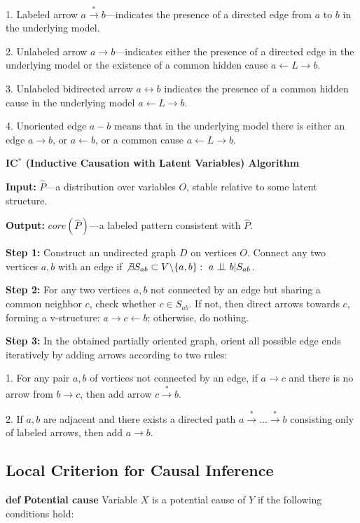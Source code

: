 \documentclass[fleqn]{article}
\newcommand{\independent}{\perp \!\!\! \perp}
\def\define#1{\textbf{def} \textbf{#1}}
\numberwithin{equation}{section}
\numberwithin{theorem}{section}
\numberwithin{figure}{section}
\numberwithin{lemma}{section}
\numberwithin{corollary}{section}
\begin{document}
1. Labeled arrow $a \xrightarrow{*} b$—indicates the presence of a directed edge from $a$ to $b$ in the underlying model.

2. Unlabeled arrow $a \rightarrow b$—indicates either the presence of a directed edge in the underlying model or the existence of a common hidden cause $a \leftarrow L \rightarrow b$.

3. Unlabeled bidirected arrow $a \leftrightarrow b$ indicates the presence of a common hidden cause in the underlying model $a \leftarrow L \rightarrow b$.

4. Unoriented edge $a - b$ means that in the underlying model there is either an edge $a \rightarrow b$, or $a \leftarrow b$, or a common cause $a \leftarrow L \rightarrow b$.

\textbf{IC$^*$ (Inductive Causation with Latent Variables) Algorithm}

\textbf{Input:} $\hat P$—a distribution over variables $O$, stable relative to some latent structure.

\textbf{Output:} $core(\hat P)$—a labeled pattern consistent with $\hat P$.

\textbf{Step 1:} Construct an undirected graph $D$ on vertices $O$. Connect any two vertices $a, b$ with an edge if $\not \exists S_{ab} \subset V \backslash \{a,b\}:\ a \independent b | S_{ab}$.

\textbf{Step 2:} For any two vertices $a, b$ not connected by an edge but sharing a common neighbor $c$, check whether $c \in S_{ab}$. If not, then direct arrows towards $c$, forming a v-structure: $a \rightarrow c \leftarrow b$; otherwise, do nothing.

\textbf{Step 3:} In the obtained partially oriented graph, orient all possible edge ends iteratively by adding arrows according to two rules:

1. For any pair $a, b$ of vertices not connected by an edge, if $a \rightarrow c$ and there is no arrow from $b \rightarrow c$, then add arrow $c \xrightarrow{*} b$.

2. If $a,b$ are adjacent and there exists a directed path $a \xrightarrow{*} ... \xrightarrow{*} b$ consisting only of labeled arrows, then add $a \rightarrow b$.

\subsection*{Local Criterion for Causal Inference}

\define{Potential cause} Variable $X$ is a potential cause of $Y$ if the following conditions hold:
\end{document}
